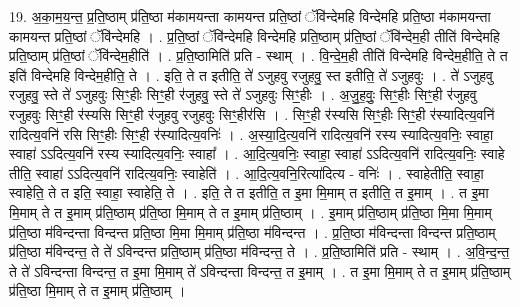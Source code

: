 \documentclass[17pt]{extarticle}
\begin{document}
19. अ॒का॒म॒य॒न्त॒ प्र॒ति॒ष्ठाम् प्र॑ति॒ष्ठा म॑कामयन्ता कामयन्त प्रति॒ष्ठां ॅवि॑न्देमहि विन्देमहि प्रति॒ष्ठा म॑कामयन्ता कामयन्त प्रति॒ष्ठां ॅवि॑न्देमहि । . प्र॒ति॒ष्ठां ॅवि॑न्देमहि विन्देमहि प्रति॒ष्ठाम् प्र॑ति॒ष्ठां ॅवि॑न्देम॒ही तीति॑ विन्देमहि प्रति॒ष्ठाम् प्र॑ति॒ष्ठां ॅवि॑न्देम॒हीति॑ । . प्र॒ति॒ष्ठामिति॑ प्रति - स्थाम् । . वि॒न्दे॒म॒ही तीति॑ विन्देमहि विन्देम॒हीति॒ ते त इति॑ विन्देमहि विन्देम॒हीति॒ ते । . इति॒ ते त इतीति॒ ते॑ ऽजुहवु रजुहवु॒ स्त इतीति॒ ते॑ ऽजुहवुः । . ते॑ ऽजुहवु रजुहवु॒ स्ते ते॑ ऽजुहवुः सिꣳ॒॒हीः सिꣳ॒॒ही र॑जुहवु॒ स्ते ते॑ ऽजुहवुः सिꣳ॒॒हीः । . अ॒जु॒ह॒वुः॒ सिꣳ॒॒हीः सिꣳ॒॒ही र॑जुहवु रजुहवुः सिꣳ॒॒ही र॑स्यसि सिꣳ॒॒ही र॑जुहवु रजुहवुः सिꣳ॒॒हीर॑सि । . सिꣳ॒॒ही र॑स्यसि सिꣳ॒॒हीः सिꣳ॒॒ही र॑स्यादित्य॒वनि॑ रादित्य॒वनि॑ रसि सिꣳ॒॒हीः सिꣳ॒॒ही र॑स्यादित्य॒वनिः॑ । . अ॒स्या॒दि॒त्य॒वनि॑ रादित्य॒वनि॑ रस्य स्यादित्य॒वनिः॒ स्वाहा॒ स्वाहा॑ ऽऽदित्य॒वनि॑ रस्य स्यादित्य॒वनिः॒ स्वाहा᳚ । . आ॒दि॒त्य॒वनिः॒ स्वाहा॒ स्वाहा॑ ऽऽदित्य॒वनि॑ रादित्य॒वनिः॒ स्वाहे तीति॒ स्वाहा॑ ऽऽदित्य॒वनि॑ रादित्य॒वनिः॒ स्वाहेति॑ । . आ॒दि॒त्य॒वनि॒रित्या॑दित्य - वनिः॑ । . स्वाहेतीति॒ स्वाहा॒ स्वाहेति॒ ते त इति॒ स्वाहा॒ स्वाहेति॒ ते । . इति॒ ते त इतीति॒ त इ॒मा मि॒माम् त इतीति॒ त इ॒माम् । . त इ॒मा मि॒माम् ते त इ॒माम् प्र॑ति॒ष्ठाम् प्र॑ति॒ष्ठा मि॒माम् ते त इ॒माम् प्र॑ति॒ष्ठाम् । . इ॒माम् प्र॑ति॒ष्ठाम् प्र॑ति॒ष्ठा मि॒मा मि॒माम् प्र॑ति॒ष्ठा म॑विन्दन्ता विन्दन्त प्रति॒ष्ठा मि॒मा मि॒माम् प्र॑ति॒ष्ठा म॑विन्दन्त । . प्र॒ति॒ष्ठा म॑विन्दन्ता विन्दन्त प्रति॒ष्ठाम् प्र॑ति॒ष्ठा म॑विन्दन्त॒ ते ते॑ ऽविन्दन्त प्रति॒ष्ठाम् प्र॑ति॒ष्ठा म॑विन्दन्त॒ ते । . प्र॒ति॒ष्ठामिति॑ प्रति - स्थाम् । . अ॒वि॒न्द॒न्त॒ ते ते॑ ऽविन्दन्ता विन्दन्त॒ त इ॒मा मि॒माम् ते॑ ऽविन्दन्ता विन्दन्त॒ त इ॒माम् । . त इ॒मा मि॒माम् ते त इ॒माम् प्र॑ति॒ष्ठाम् प्र॑ति॒ष्ठा मि॒माम् ते त इ॒माम् प्र॑ति॒ष्ठाम् । \newline
\end{document}

